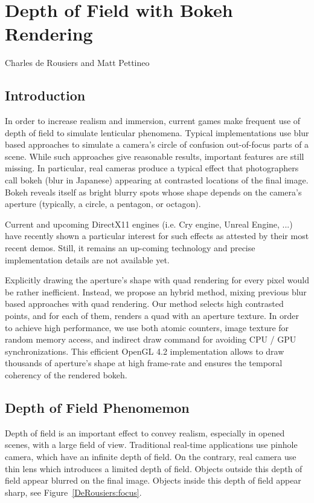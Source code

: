 \chapter{Depth of Field with Bokeh Rendering}{Charles de Rousiers and Matt Pettineo}
\label{BokehRendering}

\section{Introduction}

In order to increase realism and immersion, current games make frequent use of depth of field to simulate lenticular phenomena. Typical implementations use blur based approaches to simulate a camera’s circle of confusion out-of-focus parts of a scene. While such approaches give reasonable results, important features are still missing. In particular, real cameras produce a typical effect that photographers call bokeh (blur in Japanese) appearing at contrasted locations of the final image. Bokeh reveals itself as  bright blurry spots whose shape depends on the camera’s aperture (typically, a circle, a pentagon, or octagon).

Current and upcoming DirectX11 engines (i.e. Cry engine, Unreal Engine, ...) have recently shown a particular interest for such effects as attested by their most recent demos. Still, it  remains an up-coming technology and precise implementation details are not available yet.

Explicitly drawing the aperture’s shape with quad rendering for every pixel would be rather inefficient. Instead, we propose an hybrid method, mixing previous blur based approaches with quad rendering. Our method selects high contrasted points, and for each of them, renders a quad with an aperture texture. In order to achieve high performance, we use both atomic counters, image texture for random memory access, and indirect draw command for avoiding CPU / GPU synchronizations. This efficient OpenGL 4.2 implementation allows to draw thousands of aperture’s shape at high frame-rate and ensures the temporal coherency of the rendered bokeh.

\section{Depth of Field Phenomemon}\label{Derousiers:DOFPhenomenon}
Depth of field is an important effect to convey realism, especially in opened scenes, with a large field of view. Traditional real-time applications use pinhole camera, which have an infinite depth of field. On the contrary, real camera use thin lens which introduces a limited depth of field. Objects outside this depth of field appear blurred on the final image. Objects inside this depth of field appear sharp, see Figure~\ref{DeRousiers:focus}.


